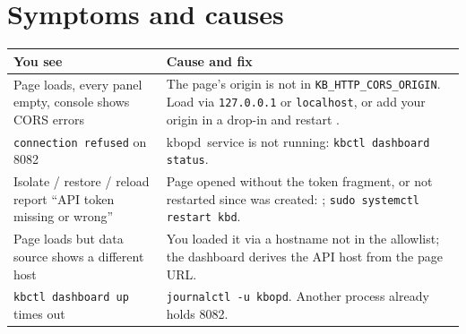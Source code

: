 \section{Symptoms and causes}
\begin{center}\small
\begin{tabularx}{\textwidth}{@{}L{4.4cm}Y@{}}
\toprule
\textbf{You see} & \textbf{Cause and fix}\\
\midrule
Page loads, every panel empty, console shows CORS errors & The page's origin is not in \texttt{KB\_HTTP\_CORS\_ORIGIN}. Load via \texttt{127.0.0.1} or \texttt{localhost}, or add your origin in a drop-in and restart .\\
\texttt{connection refused} on 8082 & \unit{kbopd.service} is not running: \texttt{kbctl dashboard status}.\\
Isolate / restore / reload report ``API token missing or wrong'' & Page opened without the token fragment, or  not restarted since  was created: ; \texttt{sudo systemctl restart kbd}.\\
Page loads but data source shows a different host & You loaded it via a hostname not in the allowlist; the dashboard derives the API host from the page URL.\\
\texttt{kbctl dashboard up} times out & \texttt{journalctl -u kbopd}. Another process already holds 8082.\\
\bottomrule
\end{tabularx}
\end{center}
